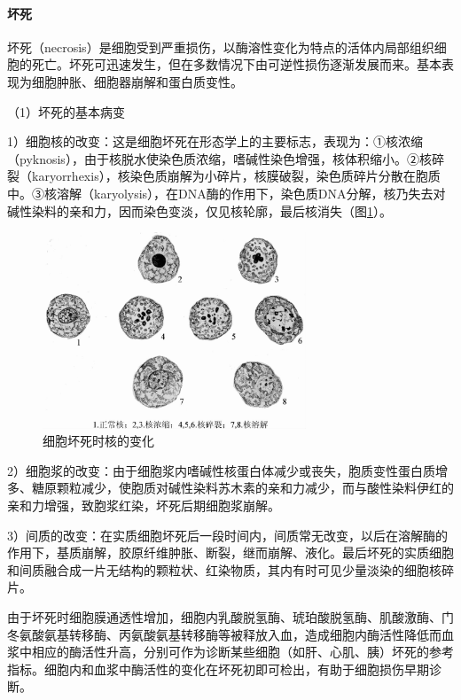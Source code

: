 \paragraph{坏死}
坏死（necrosis）是细胞受到严重损伤，以酶溶性变化为特点的活体内局部组织细胞的死亡。坏死可迅速发生，但在多数情况下由可逆性损伤逐渐发展而来。基本表现为细胞肿胀、细胞器崩解和蛋白质变性。

（1）坏死的基本病变

1）细胞核的改变：这是细胞坏死在形态学上的主要标志，表现为：①核浓缩（pyknosis），由于核脱水使染色质浓缩，嗜碱性染色增强，核体积缩小。②核碎裂（karyorrhexis），核染色质崩解为小碎片，核膜破裂，染色质碎片分散在胞质中。③核溶解（karyolysis），在DNA酶的作用下，染色质DNA分解，核乃失去对碱性染料的亲和力，因而染色变淡，仅见核轮廓，最后核消失（图\ref{fig1-13}）。

\begin{figure}[!htbp]
	\centering
	\includegraphics[width=0.7\textwidth]{./images/Image00014.jpg}
	\caption{细胞坏死时核的变化}
	\label{fig1-13}
\end{figure}

2）细胞浆的改变：由于细胞浆内嗜碱性核蛋白体减少或丧失，胞质变性蛋白质增多、糖原颗粒减少，使胞质对碱性染料苏木素的亲和力减少，而与酸性染料伊红的亲和力增强，致胞浆红染，坏死后期细胞浆崩解。

3）间质的改变：在实质细胞坏死后一段时间内，间质常无改变，以后在溶解酶的作用下，基质崩解，胶原纤维肿胀、断裂，继而崩解、液化。最后坏死的实质细胞和间质融合成一片无结构的颗粒状、红染物质，其内有时可见少量淡染的细胞核碎片。

由于坏死时细胞膜通透性增加，细胞内乳酸脱氢酶、琥珀酸脱氢酶、肌酸激酶、门冬氨酸氨基转移酶、丙氨酸氨基转移酶等被释放入血，造成细胞内酶活性降低而血浆中相应的酶活性升高，分别可作为诊断某些细胞（如肝、心肌、胰）坏死的参考指标。细胞内和血浆中酶活性的变化在坏死初即可检出，有助于细胞损伤早期诊断。

